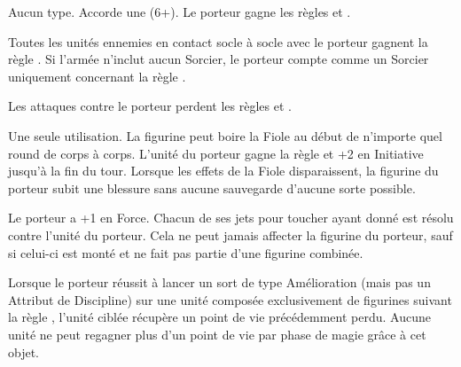 \endpricelist

\armymagicalarmour

\startpricelist

Aucun type. Accorde une \armoursave{} (6+). Le porteur gagne les règles  et \fireborn{}.

\endpricelist

\armytalismans

\startpricelist

Toutes les unités ennemies en contact socle à socle avec le porteur gagnent la règle \flammable{}. Si l'armée n'inclut aucun Sorcier, le porteur compte comme un Sorcier uniquement concernant la règle \shacklesoffire{}.

Les attaques contre le porteur perdent les règles \poisonedattacks{} et .

\endpricelist

\armyenchanteditems

\startpricelist

Une seule utilisation. La figurine peut boire la Fiole au début de n'importe quel round de corps à corps. L'unité du porteur gagne la règle \lightningreflexes{} et +2 en Initiative jusqu'à la fin du tour. Lorsque les effets de la Fiole disparaissent, la figurine du porteur subit une blessure sans aucune sauvegarde d'aucune sorte possible.



Le porteur a +1 en Force. Chacun de ses jets pour toucher ayant donné  est résolu contre l'unité du porteur. Cela ne peut jamais affecter la figurine du porteur, sauf si celui-ci est monté et ne fait pas partie d'une figurine combinée.

\endpricelist

\armyarcaneitems

\startpricelist

Lorsque le porteur réussit à lancer un sort de type Amélioration (mais pas un Attribut de Discipline) sur une unité composée exclusivement de figurines suivant la règle \shacklesoffire{}, l'unité ciblée récupère un point de vie précédemment perdu. Aucune unité ne peut regagner plus d'un point de vie par phase de magie grâce à cet objet.

\endpricelist

